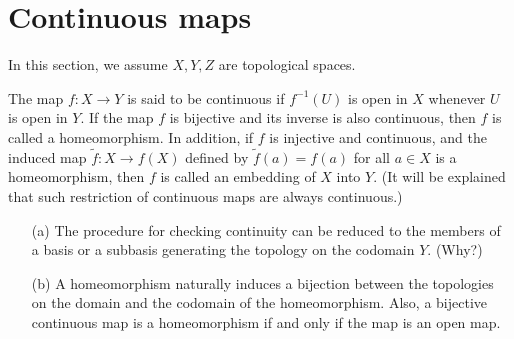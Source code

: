 \section{Continuous maps}

In this section, we assume $X, Y, Z$ are topological spaces.

\begin{defi}[Continuity]
    The map $f: X\rightarrow Y$ is said to be continuous if $f^{-1}(U)$ is open in $X$ whenever $U$ is open in $Y$.
    If the map $f$ is bijective and its inverse is also continuous, then $f$ is called a homeomorphism.
    In addition, if $f$ is injective and continuous, and the induced map $\tilde{f}: X\rightarrow f(X)$ defined by $\tilde{f}(a)=f(a)$ for all $a\in X$ is a homeomorphism, then $f$ is called an embedding of $X$ into $Y$.
    (It will be explained that such restriction of continuous maps are always continuous.)
\end{defi}

\begin{rmk}
    \begin{enumerate}
        \item[(a)]
        {
            The procedure for checking continuity can be reduced to the members of a basis or a subbasis generating the topology on the codomain $Y$. \color{brown}(Why?)\color{black}
        }
        \item[(b)]
        {
            A homeomorphism naturally induces a bijection between the topologies on the domain and the codomain of the homeomorphism. Also, a bijective continuous map is a homeomorphism if and only if the map is an open map.
        }
    \end{enumerate}
\end{rmk}


